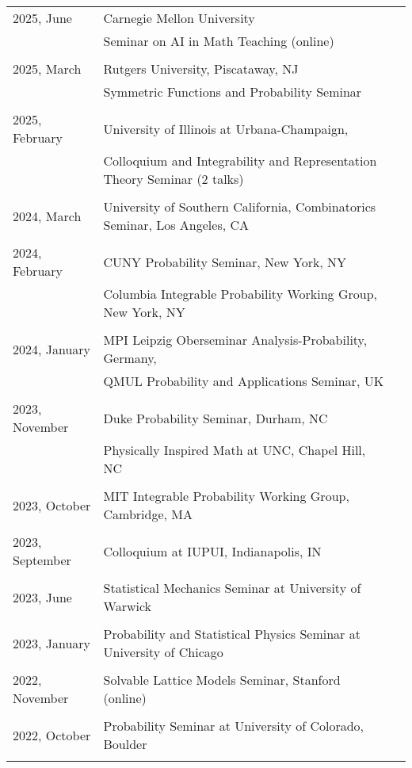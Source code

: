 \documentclass[letterpaper,11pt]{article}
\begin{document}
\begin{longtable}{llc}
		2025, June
		& Carnegie Mellon University\\ & Seminar on AI in Math Teaching (online)
		\\\\
		2025, March
		& Rutgers University, Piscataway, NJ
		\\
		& Symmetric Functions and Probability Seminar
    \\\\
    2025, February
    & University of Illinois at Urbana-Champaign,
    \\
    &
    Colloquium and Integrability and Representation Theory Seminar (2 talks)
    \\\\
    2024, March
    & University of Southern California,
    Combinatorics Seminar, Los Angeles, CA
    \\\\
	2024, February
	& CUNY Probability Seminar, New York, NY
	\\
	& Columbia Integrable Probability Working Group, New York, NY
	\\\\
	2024, January
	& MPI Leipzig Oberseminar Analysis-Probability, Germany,
	\\
	& QMUL Probability and Applications Seminar, UK
	\\\\
	2023, November
	& Duke Probability Seminar, Durham, NC
	\\
	& Physically Inspired Math at UNC, Chapel Hill, NC
	\\\\
	2023, October
	& MIT Integrable Probability Working Group, Cambridge, MA
	\\\\
	2023, September
	& Colloquium at IUPUI, Indianapolis, IN
	\\\\
	2023, June
	& Statistical Mechanics Seminar at University of Warwick
	\\\\
	2023, January
	& Probability and Statistical Physics Seminar at University of Chicago
	\\\\
	2022, November
	& Solvable Lattice Models Seminar, Stanford (online)
	\\\\
	2022, October
	& Probability Seminar at University of Colorado, Boulder
	\\\\

\end{longtable}
\end{document}
